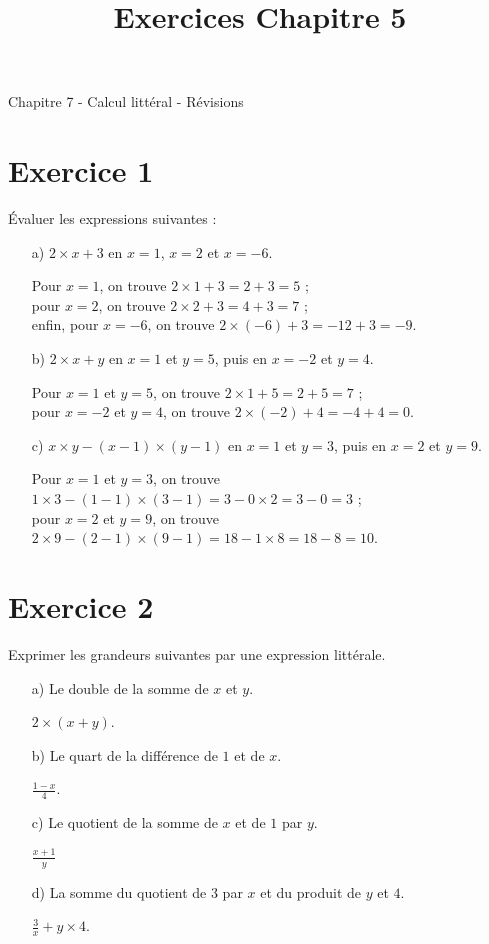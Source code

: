 \documentclass[12 pt]{article}
\title{Exercices Chapitre 5}
\date{}
\theoremstyle{plain}
\newcounter{n}
\numberwithin{n}{section}
\begin{document}
\begin{center}{\Large Chapitre 7 - Calcul littéral - Révisions}\\ 
 \end{center}

\section{Exercice 1}

Évaluer les expressions suivantes : \begin{itemize}
\item[a) ]  $2\times x +3$ en $x=1$, $x=2$ et $x=-6$.   

Pour $x=1$, on trouve $2 \times 1 + 3= 2 + 3 = 5$ ;\\ pour $x=2$, on trouve $2\times 2 + 3 = 4 + 3 = 7$ ; \\enfin, pour $x=-6$, on trouve $2\times (- 6) +3 = -12 + 3 = -9$. 
\item[b) ]  $2\times x +y$ en $x=1$ et $y=5$, puis en $x=-2$ et $y=4$.   

Pour $x=1$ et $y=5$, on trouve $2\times 1 + 5 = 2 + 5 = 7$ ; \\ pour $x=-2$ et $y=4$, on trouve $2\times(-2) + 4 = -4 + 4 = 0$. 
\item[c) ]  $x \times y - (x-1) \times (y-1) $ en $x=1$ et $y=3$, puis en $x=2$ et $y=9$. 

Pour $x=1$ et $y=3$, on trouve $1 \times 3 - (1-1)\times(3-1) = 3 - 0 \times 2 = 3- 0 = 3$ ; \\
pour $x=2$ et $y=9$, on trouve $2\times 9 - (2-1)\times(9-1) = 18 - 1 \times 8 = 18-8 = 10$. 
\end{itemize}
\section{Exercice 2}

Exprimer les grandeurs suivantes par une expression littérale. 

\begin{itemize}
\item[a) ] Le double de la somme de $x$ et $y$.

$2 \times (x + y)$. 
\item[b) ] Le quart de la différence de $1$ et de $x$. 

$\frac{1-x}4$.
\item[c) ] Le quotient de la somme de $x$ et de $1$ par $y$. 

$\frac{x+1}y$
\item[d) ] La somme du quotient de $3$ par $x$ et du produit de $y$ et $4$.

$\frac3x+y\times 4$.
\end{itemize}
\end{document}
